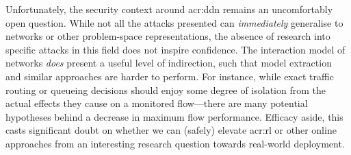 Unfortunately, the security context around \gls{acr:ddn} remains an uncomfortably open question.
While not all the attacks presented can \emph{immediately} generalise to networks or other problem-space representations, the absence of research into specific attacks in this field does not inspire confidence.
The interaction model of networks \emph{does} present a useful level of indirection, such that model extraction and similar approaches are harder to perform.
For instance, while exact traffic routing or queueing decisions should enjoy some degree of isolation from the actual effects they cause on a monitored flow---there are many potential hypotheses behind a decrease in maximum flow performance.
Efficacy aside, this casts significant doubt on whether we can (safely) elevate \gls{acr:rl} or other online approaches from an interesting research question towards real-world deployment.
